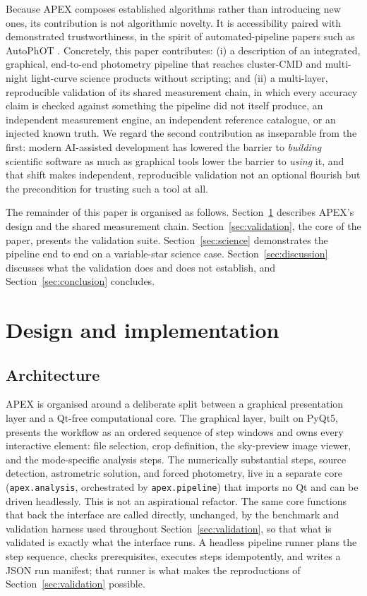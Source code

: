 \documentclass[fleqn,usenatbib]{mnras}
\begin{document}
Because APEX composes established algorithms rather than introducing new ones, its contribution is not algorithmic novelty. It is accessibility paired with demonstrated trustworthiness, in the spirit of automated-pipeline papers such as AutoPhOT \citep{brennan2022}. Concretely, this paper contributes: (i) a description of an integrated, graphical, end-to-end photometry pipeline that reaches cluster-CMD and multi-night light-curve science products without scripting; and (ii) a multi-layer, reproducible validation of its shared measurement chain, in which every accuracy claim is checked against something the pipeline did not itself produce, an independent measurement engine, an independent reference catalogue, or an injected known truth. We regard the second contribution as inseparable from the first: modern AI-assisted development has lowered the barrier to \emph{building} scientific software as much as graphical tools lower the barrier to \emph{using} it, and that shift makes independent, reproducible validation not an optional flourish but the precondition for trusting such a tool at all.

The remainder of this paper is organised as follows. Section~\ref{sec:design} describes APEX's design and the shared measurement chain. Section~\ref{sec:validation}, the core of the paper, presents the validation suite. Section~\ref{sec:science} demonstrates the pipeline end to end on a variable-star science case. Section~\ref{sec:discussion} discusses what the validation does and does not establish, and Section~\ref{sec:conclusion} concludes.

\section{Design and implementation}
\label{sec:design}

\subsection{Architecture}

APEX is organised around a deliberate split between a graphical presentation layer and a Qt-free computational core. The graphical layer, built on PyQt5, presents the workflow as an ordered sequence of step windows and owns every interactive element: file selection, crop definition, the sky-preview image viewer, and the mode-specific analysis steps. The numerically substantial steps, source detection, astrometric solution, and forced photometry, live in a separate core (\texttt{apex.analysis}, orchestrated by \texttt{apex.pipeline}) that imports no Qt and can be driven headlessly. This is not an aspirational refactor. The same core functions that back the interface are called directly, unchanged, by the benchmark and validation harness used throughout Section~\ref{sec:validation}, so that what is validated is exactly what the interface runs. A headless pipeline runner plans the step sequence, checks prerequisites, executes steps idempotently, and writes a JSON run manifest; that runner is what makes the reproductions of Section~\ref{sec:validation} possible.
\end{document}
